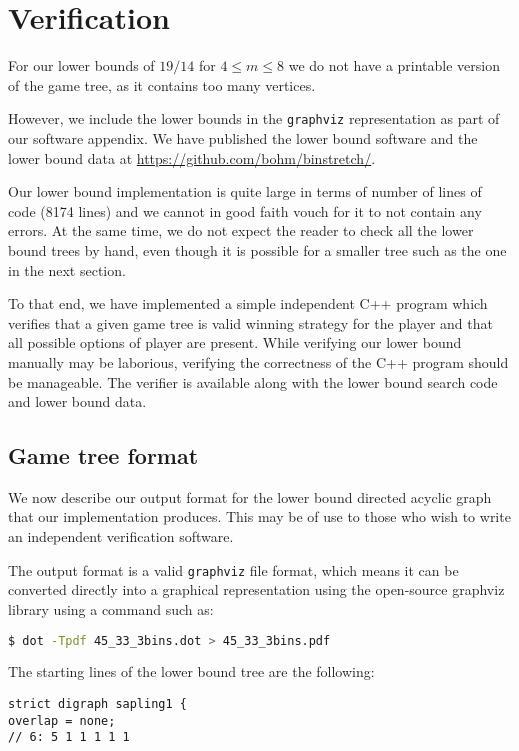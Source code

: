 \newpage
\section{Verification}\label{sec:4:verification}

For our lower bounds of $19/14$ for $4 \le m \le 8$ we do not have a
printable version of the game tree, as it contains too many vertices.

However, we include the lower bounds in the \texttt{graphviz}
representation as part of our software appendix. We have published the
lower bound software and the lower bound data at
\url{https://github.com/bohm/binstretch/}.

Our lower bound implementation is quite large in terms of number of
lines of code (8174 lines) and we cannot in good faith vouch for it to
not contain any errors. At the same time, we do not expect the reader
to check all the lower bound trees by hand, even though it is possible
for a smaller tree such as the one in the next section.

To that end, we have implemented a simple independent C++ program
which verifies that a given game tree is valid winning strategy for
the player \adversary and that all possible options of player \algo
are present. While verifying our lower bound manually may be
laborious, verifying the correctness of the C++ program should be
manageable. The verifier is available along with the lower bound
search code and lower bound data.


\subsection{Game tree format}\label{sec:4:outputformat}

We now describe our output format for the lower bound directed acyclic
graph that our implementation produces. This may be of use to those
who wish to write an independent verification software.

The output format is a valid \texttt{graphviz} file format, which
means it can be converted directly into a graphical representation
using the open-source graphviz library using a command such as:
\begin{lstlisting}[language=bash,numbers=none]
$ dot -Tpdf 45_33_3bins.dot > 45_33_3bins.pdf
\end{lstlisting}
The starting lines of the lower bound tree are the following:

\begin{lstlisting}
strict digraph sapling1 {
overlap = none;
// 6: 5 1 1 1 1 1
\end{lstlisting}

